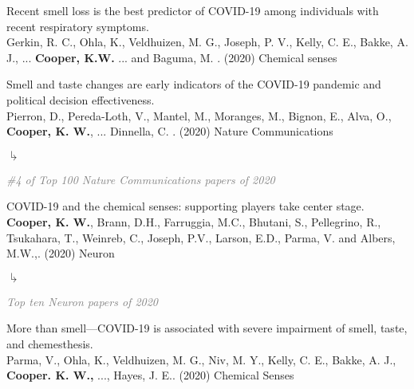 \documentclass[10pt]{cooperCV2}
\begin{document}
\begin{etaremune}[resume,itemindent=-1.5\bibhang, topsep=0pt,
				   itemsep=\bibsep,partopsep=0pt,parsep=0pt,leftmargin={\bibhang+\widthof{[999]}}] 
    
    \item Recent smell loss is the best predictor of COVID-19 among individuals with recent respiratory symptoms. \\
     Gerkin, R. C., Ohla, K., Veldhuizen, M. G., Joseph, P. V., Kelly, C. E., Bakke, A. J., ... \textbf{Cooper, K.W.} ... and Baguma, M. . (2020) Chemical senses 
     
	
    \item Smell and taste changes are early indicators of the COVID-19 pandemic and political decision effectiveness. \\
     Pierron, D., Pereda-Loth, V., Mantel, M., Moranges, M., Bignon, E., Alva, O.,  \textbf{Cooper, K. W.}, ... Dinnella, C. . (2020) Nature Communications 
     
     	\begin{list}{$\drsh$}{}
     	
	      \item \textcolor{grey}{\textit{\#4 of Top 100 Nature Communications papers of 2020} }
     	
     	\end{list} 
     
	
    \item COVID-19 and the chemical senses: supporting players take center stage. \\
     \textbf{Cooper, K. W.}, Brann, D.H., Farruggia, M.C., Bhutani, S., Pellegrino, R., Tsukahara, T., Weinreb, C., Joseph, P.V., Larson, E.D., Parma, V. and Albers, M.W.,. (2020) Neuron 
     
     	\begin{list}{$\drsh$}{}
     	
	      \item \textcolor{grey}{\textit{Top ten Neuron papers of 2020} }
     	
     	\end{list} 
     
	
    \item More than smell—COVID-19 is associated with severe impairment of smell, taste, and chemesthesis. \\
     Parma, V., Ohla, K., Veldhuizen, M. G., Niv, M. Y., Kelly, C. E., Bakke, A. J., \textbf{Cooper. K. W.,} ..., Hayes, J. E.. (2020) Chemical Senses 
     

\end{etaremune}
\end{document}
